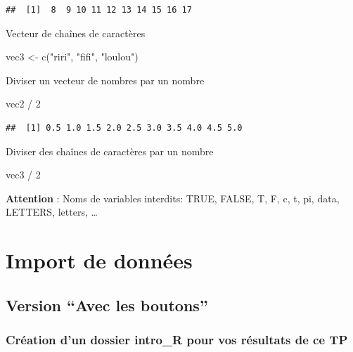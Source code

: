 \documentclass[
]{book}
\newenvironment{Shaded}{\begin{snugshade}}{\end{snugshade}}
\newcommand{\DecValTok}[1]{\textcolor[rgb]{0.00,0.00,0.81}{#1}}
\newcommand{\FunctionTok}[1]{\textcolor[rgb]{0.00,0.00,0.00}{#1}}
\newcommand{\NormalTok}[1]{#1}
\newcommand{\OtherTok}[1]{\textcolor[rgb]{0.56,0.35,0.01}{#1}}
\newcommand{\SpecialCharTok}[1]{\textcolor[rgb]{0.00,0.00,0.00}{#1}}
\newcommand{\StringTok}[1]{\textcolor[rgb]{0.31,0.60,0.02}{#1}}
\begin{document}
\begin{verbatim}
##  [1]  8  9 10 11 12 13 14 15 16 17
\end{verbatim}

Vecteur de chaînes de caractères

\begin{Shaded}
\begin{Highlighting}[]
\NormalTok{vec3 }\OtherTok{\textless{}{-}}  \FunctionTok{c}\NormalTok{(}\StringTok{"riri"}\NormalTok{, }\StringTok{"fifi"}\NormalTok{, }\StringTok{"loulou"}\NormalTok{)}
\end{Highlighting}
\end{Shaded}

Diviser un vecteur de nombres par un nombre

\begin{Shaded}
\begin{Highlighting}[]
\NormalTok{vec2 }\SpecialCharTok{/} \DecValTok{2}
\end{Highlighting}
\end{Shaded}

\begin{verbatim}
##  [1] 0.5 1.0 1.5 2.0 2.5 3.0 3.5 4.0 4.5 5.0
\end{verbatim}

Diviser des chaînes de caractères par un nombre

\begin{Shaded}
\begin{Highlighting}[]
\NormalTok{vec3  }\SpecialCharTok{/} \DecValTok{2}   
\end{Highlighting}
\end{Shaded}

\textbf{Attention} : Noms de variables interdits: TRUE, FALSE, T, F, c, t, pi, data, LETTERS, letters, \ldots{}

\hypertarget{import-de-donnuxe9es}{%
\chapter{Import de données}\label{import-de-donnuxe9es}}

\hypertarget{version-avec-les-boutons}{%
\section{Version ``Avec les boutons''}\label{version-avec-les-boutons}}

\hypertarget{cruxe9ation-dun-dossier-intro_r-pour-vos-ruxe9sultats-de-ce-tp}{%
\subsection{Création d'un dossier intro\_R pour vos résultats de ce TP}\label{cruxe9ation-dun-dossier-intro_r-pour-vos-ruxe9sultats-de-ce-tp}}
\end{document}

